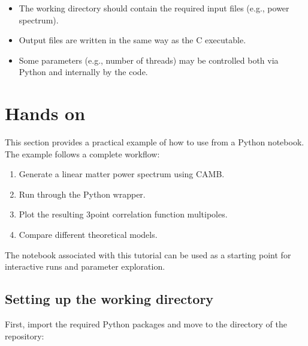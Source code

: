 \documentclass[letterpaper,10pt,english]{sphinxmanual}
\begin{document}
\sphinxAtStartPar
{}
\begin{itemize}
\item {} 
\sphinxAtStartPar
The working directory should contain the required input files (e.g., power spectrum).

\item {} 
\sphinxAtStartPar
Output files are written in the same way as the C executable.

\item {} 
\sphinxAtStartPar
Some parameters (e.g., number of threads) may be controlled both via Python and internally by the code.

\end{itemize}

\sphinxstepscope


\chapter{Hands on}
\label{\detokenize{handson:hands-on}}\label{\detokenize{handson::doc}}
\sphinxAtStartPar
This section provides a practical example of how to use  from a
Python notebook. The example follows a complete workflow:
\begin{enumerate}
%
\item {} 
\sphinxAtStartPar
Generate a linear matter power spectrum using CAMB.

\item {} 
\sphinxAtStartPar
Run  through the Python wrapper.

\item {} 
\sphinxAtStartPar
Plot the resulting 3\sphinxhyphen{}point correlation function multipoles.

\item {} 
\sphinxAtStartPar
Compare different theoretical models.

\end{enumerate}

\sphinxAtStartPar
The notebook associated with this tutorial can be used as a starting point
for interactive runs and parameter exploration.


\section{Setting up the working directory}
\label{\detokenize{handson:setting-up-the-working-directory}}
\sphinxAtStartPar
First, import the required Python packages and move to the  directory
of the repository:
\end{document}
